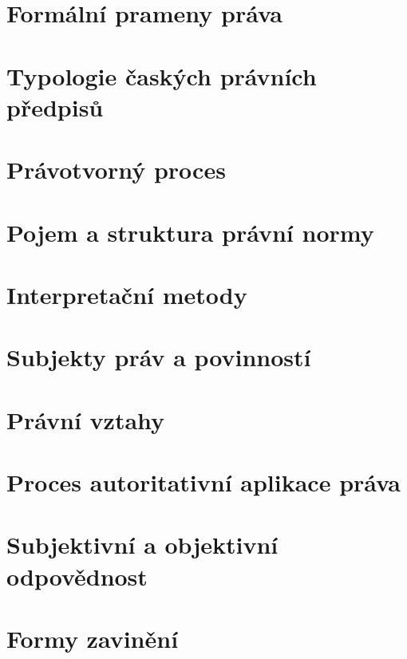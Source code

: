 \section{Formální prameny práva}

\newpage
\section{Typologie čaských právních předpisů}

\newpage
\section{Právotvorný proces}

\newpage
\section{Pojem a struktura právní normy}

\newpage
\section{Interpretační metody}

\newpage
\section{Subjekty práv a povinností}

\newpage
\section{Právní vztahy}

\newpage
\section{Proces autoritativní aplikace práva}

\newpage
\section{Subjektivní a objektivní odpovědnost}

\newpage
\section{Formy zavinění}